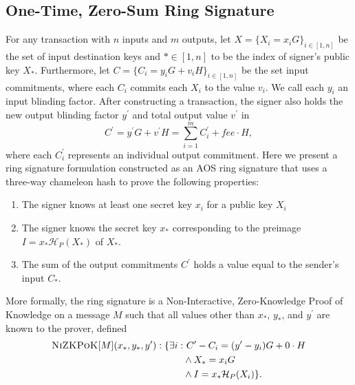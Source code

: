 \documentclass{article}
\newcommand{\algoname}[1]{\textnormal{\textsc{#1}}}
\newcommand{\nizkpok}{\algoname{NiZKPoK}}
\newcommand{\sidx}{\ensuremath{*}}
\newcommand{\pkset}{\ensuremath{X}}
\newcommand{\ix}{\ensuremath{x_i}}
\newcommand{\sx}{\ensuremath{x_\sidx}}
\newcommand{\ipk}{\ensuremath{X_i}}
\newcommand{\spk}{\ensuremath{X_\sidx}}
\newcommand{\iy}{\ensuremath{y_i}}
\newcommand{\sy}{\ensuremath{y_\sidx}}
\newcommand{\oy}{\ensuremath{y^\prime}}
\newcommand{\iC}{\ensuremath{C_i}}
\newcommand{\sC}{\ensuremath{C_\sidx}}
\newcommand{\oC}{\ensuremath{C^\prime}}
\newcommand{\oiC}{\ensuremath{C^\prime_i}}
\newcommand{\iv}{\ensuremath{v_i}}
\newcommand{\ov}{\ensuremath{v^\prime}}
\newcommand{\hp}{\ensuremath{\mathcal{H}_P}}
\begin{document}
\subsection{One-Time, Zero-Sum Ring Signature}

For any transaction with $n$ inputs and $m$ outputs, let $\pkset = \{ \ipk = \ix
G\}_{i \in [1,n]}$ be the set of input destination keys and $\sidx \in [1,n]$ to
be the index of signer's public key {\spk}.  Furthermore, let $C = \{ {\iC} =
{\iy} G + \iv H \}_{i \in [1,n]}$ be the set input commitments, where each $\iC$
commits each {\ipk} to the value {\iv}.  We call each {\iy} an input blinding
factor.  After constructing a transaction, the signer also holds the new output
blinding factor {\oy} and total output value {\ov} in
\[ \oC = \oy G + \ov H = \sum_{i=1}^{m} \oiC + fee \cdot H, \]
where each $\oiC$ represents an individual output commitment.  Here we present
a ring signature formulation constructed as an AOS ring signature \cite{AOS02}
that uses a three-way chameleon hash to prove the following properties:
\begin{enumerate}
  \item The signer knows at least one secret key {\ix} for a public key {\ipk}

  \item The signer knows the secret key {\sx} corresponding to the preimage $I =
  {\sx} \hp({\spk})$ of {\spk}.

  \item The sum of the output commitments {\oC} holds a value equal to the
  sender's input {\sC}.
\end{enumerate}
More formally, the ring signature is a Non-Interactive, Zero-Knowledge Proof of
Knowledge on a message $M$ such that all values other than {\sx}, {\sy}, and
{\oy} are known to the prover, defined 
\begin{align*}
\nizkpok[M](\sx, \sy, \oy) : \{ \exists i : 
& ~ \oC - \iC = (\oy - \iy)G + 0 \cdot H\\
& \land \spk = \ix G \\
& \land I = \sx \hp(\ipk)\}.
\end{align*}
\end{document}
